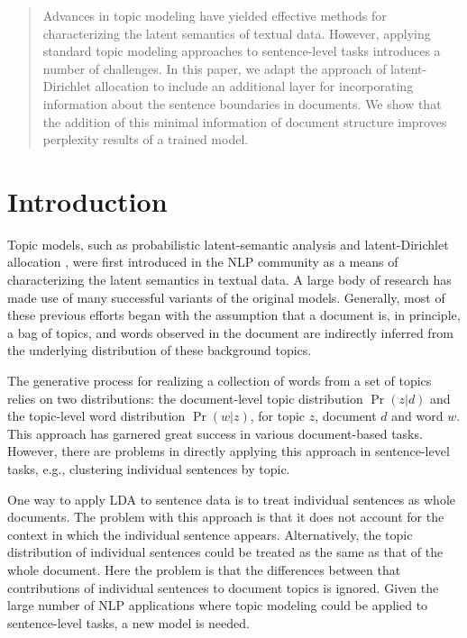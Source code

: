 \begin{abstract}

Advances in topic modeling have yielded effective methods for characterizing
the latent semantics of textual data.  However, applying standard topic
modeling approaches to sentence-level tasks introduces a number of challenges.
In this paper, we adapt the approach of latent-Dirichlet allocation to include
an additional layer for incorporating information about the sentence boundaries
in documents.  We show that the addition of this minimal information of
document structure improves perplexity results of a trained model.  

\end{abstract}

\section{Introduction} \label{s:introduction}

Topic models, such as probabilistic latent-semantic analysis
\cite{hofmann1999probabilistic} and latent-Dirichlet allocation
\cite{blei2003latent}, were first introduced in the NLP community as a means of
characterizing the latent semantics in textual data.  A large body of
research has made use of many successful variants of the
original models.  Generally, most of these previous efforts began with the
assumption that a document is, in principle, a bag of topics, and words 
observed in the document are indirectly inferred from the underlying
distribution of these background topics.  

The generative process for realizing a collection of words from a set of topics
relies on two distributions: the document-level topic distribution $\Pr(z|d)$
and the topic-level word distribution $\Pr(w|z)$, for topic $z$, document $d$
and word $w$.   This approach has garnered great success in various
document-based tasks.  However, there are problems in directly applying this
approach in sentence-level tasks, e.g., clustering individual sentences by
topic.

One way to apply LDA to sentence data is to treat individual sentences as whole
documents.  The problem with this approach is that it does not account for the
context in which the individual sentence appears.  Alternatively, the topic
distribution of individual sentences could be treated as the same as that of
the whole document.  Here the problem is that the differences between that
contributions of individual sentences to document topics is ignored.  Given the
large number of NLP applications where topic modeling could be applied to
sentence-level tasks, a new model is needed.

